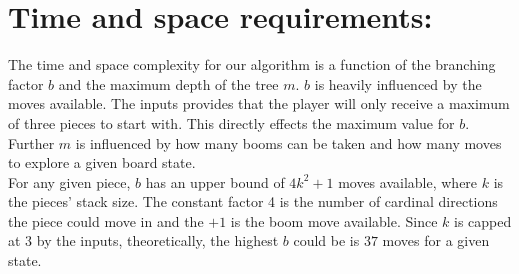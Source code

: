 \documentclass[fleqn]{article}
\begin{document}
\begin{figure}%
   \centering
   	\qquad
	  \label{fig:example}%
\end{figure}
\section{Time and space requirements:}

\noindent The time and space complexity for our algorithm is a function of the branching factor $b$ and the maximum depth of the tree $m$. $b$ is heavily influenced by the moves available. The inputs provides that the player will only receive a maximum of three pieces to start with. This directly effects the maximum value for $b$. Further $m$ is influenced by how many booms can be taken and how many moves to explore a given board state.\\

\noindent For any given piece, $b$ has an upper bound of $4k^2 + 1$ moves available, where $k$ is the pieces' stack size. The constant factor 4 is the number of cardinal directions the piece could move in and the $+1$ is the boom move available. Since $k$ is capped at 3 by the inputs, theoretically, the highest $b$ could be is $37$ moves for a given state.\\
\end{document}
